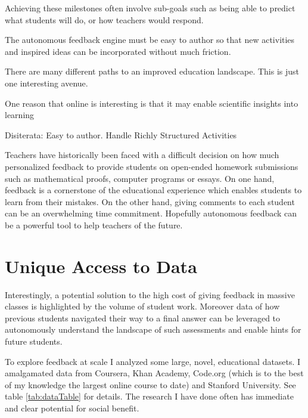 Achieving these milestones often involve sub-goals such as being able to predict what students will do, or how teachers would respond.

The autonomous feedback engine must be easy to author so that new activities and inspired ideas can be incorporated without much friction.

There are many different paths to an improved education landscape. This is just one interesting avenue.

One reason that online is interesting is that it may enable scientific insights into learning

Disiterata:
Easy to author.
Handle Richly Structured Activities

Teachers have historically been faced with a difficult decision on how much personalized
feedback to provide students on open-ended homework submissions
such as mathematical proofs, computer programs or essays. On one hand, feedback
is a cornerstone of the educational experience which enables students to
learn from their mistakes. On the other hand, giving comments to each student
can be an overwhelming time commitment. Hopefully autonomous feedback can be a powerful tool to help teachers of the future.


\section{Unique Access to Data}

Interestingly, a potential solution to the high cost of giving feedback in
massive classes is highlighted by the volume of student work.  Moreover data of how previous students navigated their way to a
final answer can be leveraged to autonomously understand the landscape of
such assessments and enable hints for future students.

To explore feedback at scale I analyzed some large, novel, educational
datasets. I amalgamated data from Coursera, Khan Academy, Code.org (which is to the
best of my knowledge the largest online course to date) and Stanford University.
See table \ref{tab:dataTable} for details. The research I have done often has immediate and clear
potential for social benefit.

